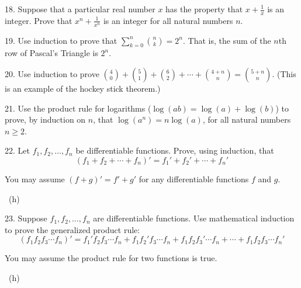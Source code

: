 \documentclass[10pt,]{book}
\theoremstyle{plain}
\theoremstyle{definition}
\theoremstyle{definition}
\theoremstyle{definition}
\numberwithin{equation}{chapter}
\def\d{\displaystyle}
\begin{document}
\begin{exerciselist}
\par\smallskip
\item[18.]\hypertarget{exercise-152}{}\hypertarget{p-2741}{}%
Suppose that a particular real number \(x\) has the property that \(x + \frac{1}{x}\) is an integer. Prove that \(x^n + \frac{1}{x^n}\) is an integer for all natural numbers \(n\).%
\par\smallskip
\item[19.]\hypertarget{exercise-153}{}\hypertarget{p-2744}{}%
Use induction to prove that \(\d\sum_{k=0}^n {n \choose k} = 2^n\). That is, the sum of the \(n\)th row of Pascal's Triangle is \(2^n\).%
\par\smallskip
\item[20.]\hypertarget{exercise-154}{}\hypertarget{p-2745}{}%
Use induction to prove \({4 \choose 0} + {5 \choose 1} + {6 \choose 2} + \cdots + {4+n \choose n} = {5+n \choose n}\). (This is an example of the hockey stick theorem.)%
\par\smallskip
\item[21.]\hypertarget{exercise-155}{}\hypertarget{p-2746}{}%
Use the product rule for logarithms (\(\log(ab) = \log(a) + \log(b)\)) to prove, by induction on \(n\), that \(\log(a^n) = n \log(a)\), for all natural numbers \(n \ge 2\).%
\par\smallskip
\item[22.]\hypertarget{exercise-156}{}\hypertarget{p-2749}{}%
Let \(f_1, f_2,\ldots, f_n\) be differentiable functions. Prove, using induction, that%
\begin{equation*}
(f_1 + f_2 + \cdots + f_n)' = f_1' + f_2' + \cdots + f_n'
\end{equation*}
%
\par
\hypertarget{p-2750}{}%
You may assume \((f+g)' = f' + g'\) for any differentiable functions \(f\) and \(g\).%
\par\smallskip
~{\tiny (h)}\item[23.]\hypertarget{exercise-157}{}\hypertarget{p-2752}{}%
Suppose \(f_1, f_2, \ldots, f_n\) are differentiable functions. Use mathematical induction to prove the generalized product rule:%
\begin{equation*}
(f_1 f_2 f_3 \cdots f_n)' = f_1' f_2 f_3 \cdots f_n + f_1 f_2' f_3 \cdots f_n + f_1 f_2 f_3' \cdots f_n + \cdots + f_1 f_2 f_3 \cdots f_n'
\end{equation*}
%
\par
\hypertarget{p-2753}{}%
You may assume the product rule for two functions is true.%
\par\smallskip
~{\tiny (h)}\end{exerciselist}
\typeout{************************************************}
\typeout{************************************************}
\end{document}
